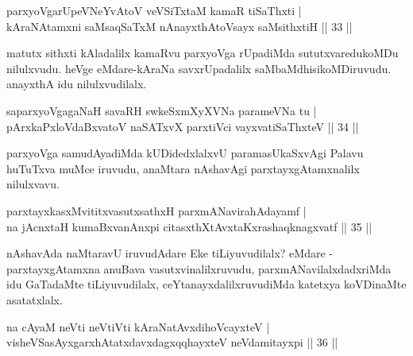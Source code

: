 \begin{shl}
parxyoVgarUpeVNeYvAtoV veVSiTxtaM kamaR tiSaThxti |\\
kAraNAtamxni saMsaqSaTxM nAnayxthA\s toV\s sayx saMsithxtiH \hfill || 33 ||
\end{shl}

\begin{artha}%
matutx sithxti kAladalilx kamaRvu parxyoVga rUpadiMda sututxvaredukoMDu nilulxvudu. heVge eMdare-kAraNa savxrUpadalilx saMbaMdhisikoMDiruvudu. anayxthA idu nilulxvudilalx.
\end{artha}

\begin{shl}
saparxyoVgagaNaH savaRH swkeSxmXyXVNa parameVNa tu |\\
pArxkaPxloVdaBxvatoV naSATxvX parxtiVci vayxvatiSaThxteV \hfill || 34 ||
\end{shl}

\begin{artha}
parxyoVga samudAyadiMda kUDidedxlalxvU paramasUkaSxvAgi Palavu huTuTxva muMce iruvudu, anaMtara nAshavAgi parxtayxgAtamxnalilx nilulxvavu.
\end{artha}

\begin{shl}
parxtayxkasxMvititxvasutxsathxH parxmANavirahAdayamf |\\
na jAcnxtaH kumaBxvanAnxpi citasxthXtAvxtaKxrashaqknagxvatf \hfill || 35 ||
\end{shl}

\begin{artha}
nAshavAda naMtaravU iruvudAdare Eke tiLiyuvudilalx? eMdare - parxtayxgAtamxna anuBava vasutxvinalilxruvudu, parxmANavilalxdadxriMda idu GaTadaMte tiLiyuvudilalx, ceYtanayxdalilxruvudiMda katetxya koVDinaMte asatatxlalx.
\end{artha}


\begin{shl}
na cAyaM neVti neVtiVti kAraNatAvxdihoVcayxteV |\\
visheVSasAyxgarxhAtatxdavxdagxqqhayxteV neVdamitayxpi \hfill || 36 ||
\end{shl}

